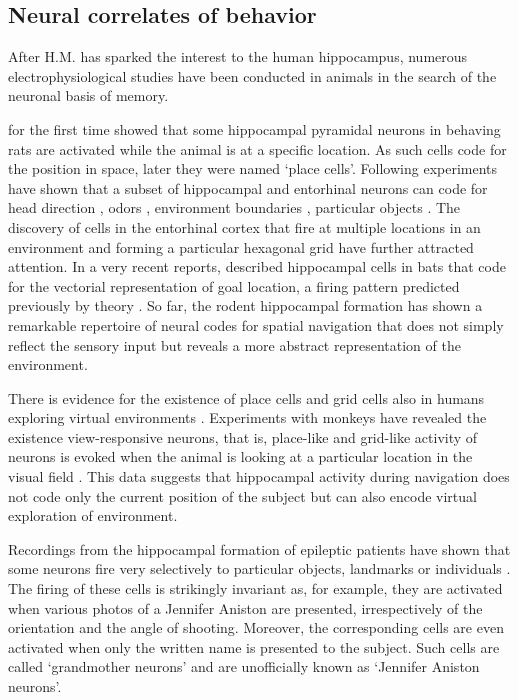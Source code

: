     
  \subsection{Neural correlates of behavior} 
    After H.M. has sparked the interest to the human hippocampus, numerous
    electrophysiological studies have been conducted in animals in the
    search of the neuronal basis of memory.

    \cite{OKeefe1971} for the first time showed that some hippocampal pyramidal
    neurons in behaving rats are activated while the animal is at a specific
    location. As such cells code for the position in space, later they were
    named `place cells'. Following experiments have shown that a subset of
    hippocampal and entorhinal neurons can code for head direction
    \citep{Taube1990a, Taube1990b}, odors \citep{Wood1999}, environment
    boundaries \citep{Jeffery2006}, particular objects \citep{Manns2009}. The
    discovery of cells in the entorhinal cortex that fire at multiple locations
    in an environment and forming a particular hexagonal grid
    \citep{Hafting2005} have further attracted attention. In a very recent reports, \cite{Sarel2017} described
    hippocampal cells in bats that code for the vectorial representation of
    goal location, a firing pattern predicted previously by theory
    \citep{Stemmler2015}. So far, the rodent hippocampal formation has shown a remarkable
    repertoire of neural codes for spatial navigation that does not simply
    reflect the sensory input but reveals a more abstract representation of the
    environment.
  
    There is evidence for the existence of place cells and grid cells
    also in humans exploring virtual environments \citep{Ekstrom2003,
    Jacobs2013}. Experiments with monkeys have revealed the existence
    view-responsive neurons, that is, place-like and grid-like activity of
    neurons is evoked when the animal is looking at a particular location in
    the visual field \citep{Rolls1995, Killian2012}. This data suggests that
    hippocampal activity during navigation does not code only the current
    position of the subject but can also encode virtual exploration of
    environment.
    
    Recordings from the hippocampal formation of epileptic patients have shown
    that some neurons fire very selectively to particular objects, landmarks or
    individuals \citep{Quiroga2005}. The firing of these cells is strikingly
    invariant as, for example, they are activated when various photos of a
    Jennifer Aniston are presented, irrespectively of the orientation and the
    angle of shooting. Moreover, the corresponding cells are even activated
    when only the written name is presented to the subject. Such cells are
    called `grandmother neurons' and are unofficially known as `Jennifer
    Aniston neurons'.

